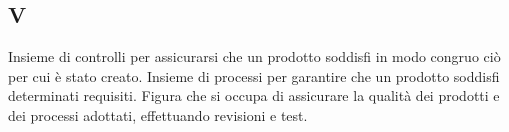 \begin{center}
\section*{V}
\end{center}
Insieme di controlli per assicurarsi che un prodotto soddisfi in modo congruo ciò per cui è stato creato.
Insieme di processi per garantire che un prodotto soddisfi determinati requisiti.
Figura che si occupa di assicurare la qualità dei prodotti e dei processi adottati, effettuando revisioni e test.
